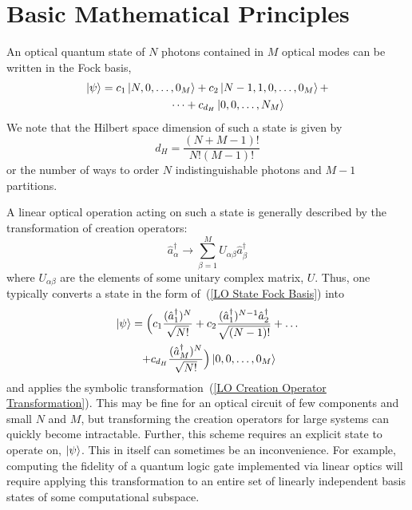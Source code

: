 \documentclass[aps,pra,twocolumn,showpacs,superscriptaddress,floatfix,10pt]{revtex4}
\begin{document}
\section{Basic Mathematical Principles}
\label{Intro}
An optical quantum state of $N$ photons contained in $M$ optical modes can be written in the Fock basis,
\begin{eqnarray}
	\label{LO State Fock Basis}
	\ket{\psi} = c_1 \ket{N,0,\dots,0_M} + c_2 \ket{N-1,1,0,\dots, 0_M} + \\* \dots  + c_{d_H} \ket{0,0,\dots,N_M}	\nonumber \quad \quad \quad \quad
\end{eqnarray}
We note that the Hilbert space dimension of such a state is given by
\begin{equation}
\label{Hilbert Space Dimension}
	d_H = \frac{(N+M-1)!}{N!(M-1)!}
\end{equation}
or the number of ways to order $N$ indistinguishable photons and $M-1$ partitions.

A linear optical operation acting on such a state is generally described by the transformation of creation operators:
\begin{equation}
\label{LO Creation Operator Transformation}
\hat{a}^\dagger_\alpha \rightarrow \sum_{\beta=1}^{M} U_{\alpha\beta} \hat{a}^\dagger_\beta
\end{equation}
where $U_{\alpha \beta}$ are the elements of some unitary complex matrix, $U$. Thus, one typically converts a state in the form of~(\ref{LO State Fock Basis}) into
\begin{eqnarray}
\ket{\psi} = \Big(c_1 \frac{(\hat{a}^\dagger_1)^N}{\sqrt{N!}} + c_2 \frac{ (\hat{a}^\dagger_1)^{N-1} \hat{a}^\dagger_2}{\sqrt{(N-1)!}} + \dots \\* + c_{d_H} \frac{(\hat{a}^\dagger_M)^N}{\sqrt{N!}}\Big) \ket{0,0,\dots,0_M} \quad \quad \nonumber
\end{eqnarray}
and applies the symbolic transformation~(\ref{LO Creation Operator Transformation}). This may be fine for an optical circuit of few components and small $N$ and $M$, but transforming the creation operators for large systems can quickly become intractable. Further, this scheme requires an explicit state to operate on, $\ket{\psi}$. This in itself can sometimes be an inconvenience. For example, computing the fidelity of a quantum logic gate implemented via linear optics will require applying this transformation to an entire set of linearly independent basis states of some computational subspace.
\end{document}
